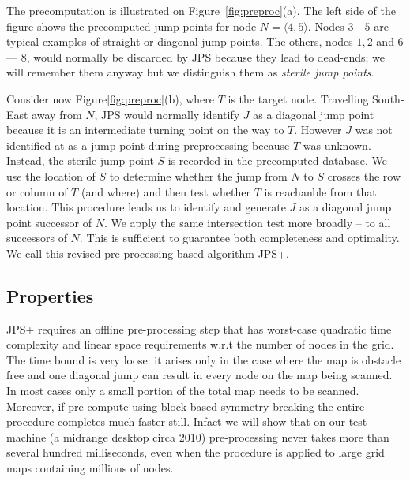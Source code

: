 The precomputation is illustrated on Figure~\ref{fig:preproc}(a).
The left side of the figure shows the precomputed jump points 
for node $N = \langle 4,5\rangle$.  
Nodes $3$---$5$ are typical examples of straight or diagonal 
jump points.  
The others, nodes $1, 2$ and $6$ --- $8$, would normally be discarded 
by JPS because they lead to dead-ends; we will remember them 
anyway but we distinguish them as \emph{sterile jump points}.  

Consider now Figure\ref{fig:preproc}(b), where $T$ is the target node.  
Travelling South-East away from $N$, JPS would normally identify 
$J$ as a diagonal jump point because it is an intermediate turning
point on the way to $T$.
However $J$ was not identified at as a jump point during preprocessing 
because $T$ was unknown.  
Instead, the sterile jump point $S$ is recorded in the precomputed 
database. We use the location of $S$ to determine whether the jump from 
$N$ to $S$ crosses the row or column of $T$ (and where) and then test 
whether $T$ is reachanble from that location. This procedure 
leads us to identify and generate $J$ as a diagonal jump point successor
of $N$. We apply the same intersection test more broadly -- to all 
successors of $N$. This is sufficient to guarantee both completeness 
and optimality. We call this revised pre-processing based algorithm 
JPS+.

\subsection*{Properties}
JPS+ requires an offline pre-processing step that has worst-case quadratic 
time complexity and linear space requirements w.r.t the number of nodes in 
the grid. The time bound is very loose: it arises only in the case 
where the map is obstacle free and one diagonal jump can result in
every node on the map being scanned. In most cases only a small portion
of the total map needs to be scanned. Moreover, if pre-compute using block-based 
symmetry breaking the entire procedure completes much faster still. 
Infact we will show that on our test machine (a midrange desktop
circa 2010) pre-processing never takes more than several hundred milliseconds,
even when the procedure is applied to large grid maps containing millions
of nodes.

